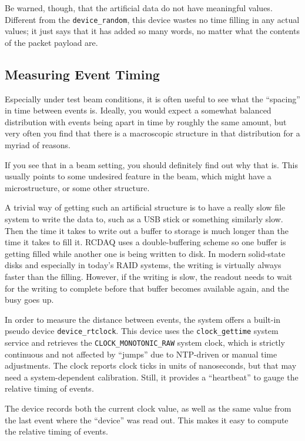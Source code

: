 \documentclass{article}[11pt]
\begin{document}
Be warned, though, that the artificial data do not have meaningful
values. Different from the \verb|device_random|, this device wastes
no time filling in any actual values; it just says that it has added
so many words, no matter what the contents of the packet payload are.

\subsection{Measuring Event Timing}
\label{eventtiming}

Especially under test beam conditions, it is often useful to see what
the ``spacing'' in time between events is. Ideally, you would expect a
somewhat balanced distribution with events being apart in time by
roughly the same amount, but very often you find that there is a
macroscopic structure in that distribution for a myriad of reasons.

If you see that in a beam setting, you should definitely find out why
that is. This usually points to some undesired feature in the beam,
which might have a microstructure, or some other structure. 

A trivial way of getting such an artificial structure is to have a
really slow file system to write the data to, such as a USB stick or
something similarly slow. Then the time it takes to write out a buffer to
storage is much longer than the time it takes to fill it. RCDAQ uses a
double-buffering scheme so one buffer is getting filled while 
another one is being written to disk. In modern solid-state disks and
especially in today's RAID systems, the writing is virtually always
faster than the filling. However, if the writing is slow, the readout
needs to wait for the writing to complete before that buffer becomes
available again, and the busy goes up.

In order to measure the distance between events, the system offers a
built-in pseudo device \verb|device_rtclock|. This device uses the
\verb|clock_gettime| system service and retrieves the
\verb|CLOCK_MONOTONIC_RAW| system clock, which is strictly continuous
and not affected by ``jumps'' due to NTP-driven or manual time
adjustments. The clock reports clock ticks in units of nanoseconds,
but that may need a system-dependent calibration. Still, it provides a
``heartbeat'' to gauge the relative timing of events. 

The device records both the current clock value, as well as the same
value from the last event where the ``device'' was read out. This
makes it easy to compute the relative timing of events.
\end{document}
